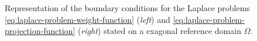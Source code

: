 \documentclass[12pt, a4paper, twoside, openright, notitlepage]{report}
\numberwithin{equation}{chapter}
\theoremstyle{theorem}
\theoremstyle{definition}
\theoremstyle{remark}
\theoremstyle{proposition}
\numberwithin{figure}{chapter}
\begin{document}
\begin{figure}[t]
\begin{minipage}{0.45\textwidth}
			\end{minipage}
			
			\caption{Representation of the boundary conditions for the Laplace problems \eqref{eq:laplace-problem-weight-function} (\emph{left}) and \eqref{eq:laplace-problem-projection-function} (\emph{right}) stated on a exagonal reference domain $\Omega$.}
			\label{fig:laplace-bc}
		\end{figure}
	
\end{document}
